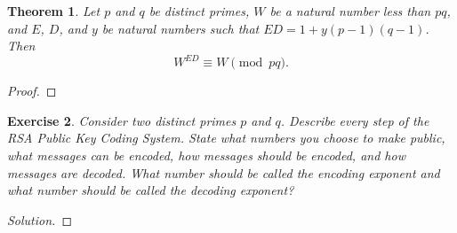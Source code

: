 \documentclass[12pt,leqno]{article}
\numberwithin{equation}{section}
\newtheorem{thm}{Theorem}[section]
\newtheorem{exer}[thm]{Exercise}
\theoremstyle{definition}
\begin{document}
\begin{thm}
Let $p$ and $q$ be distinct primes, $W$ be a natural number less
than $pq$, and $E$, $D$, and $y$ be natural numbers such that
$ED=1+y(p-1)(q-1)$. Then
\[W^{ED}\equiv W\pmod{pq}.\]
\end{thm}
\begin{proof}[Proof]
\end{proof}

\begin{exer}
Consider two distinct primes $p$ and $q$. Describe every step of the
RSA Public Key Coding System. State what numbers you choose to make
public, what messages can be encoded, how messages should be
encoded, and how messages are decoded.  What number should be called
the \textit{encoding exponent} and what number should be called the
\textit{decoding exponent}?
\end{exer}
\begin{proof}[Solution]
\end{proof}
\end{document}
